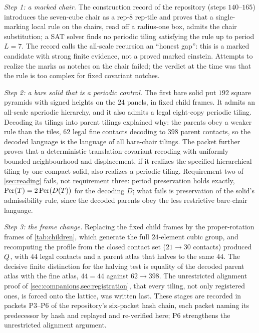 \emph{Step 1: a marked chair.} The construction record of the repository (steps $140$--$165$)
introduces the seven-cube chair as a rep-8 rep-tile and proves that a single-marking local rule
on the chairs, read off a radius-one box, admits the chair substitution; a SAT solver finds no
periodic tiling satisfying the rule up to period $L=7$. The record calls the all-scale recursion
an ``honest gap'': this is a marked candidate with strong finite evidence, not a proved marked
einstein. Attempts to realize the marks as notches on the chair failed; the verdict at the time
was that the rule is too complex for fixed covariant notches.

\emph{Step 2: a bare solid that is a periodic control.} The first bare solid put $192$ square
pyramids with signed heights on the $24$ panels, in fixed child frames. It admits an all-scale
aperiodic hierarchy, and it also admits a legal eight-copy periodic tiling. Decoding its tilings
into parent tilings explained why: the parents obey a weaker rule than the tiles, $62$ legal fine
contacts decoding to $398$ parent contacts, so the decoded language is the language of all
bare-chair tilings. The packet further proves that a deterministic translation-covariant recoding
with uniformly bounded neighbourhood and displacement, if it realizes the specified hierarchical
tiling by one compact solid, also realizes a periodic tiling. Requirement two of
\cref{sec:reading} fails, not requirement three: period preservation holds exactly,
$\operatorname{Per}(T)=2\operatorname{Per}(D(T))$ for the decoding $D$; what fails is preservation of the solid's
admissibility rule, since the decoded parents obey the less restrictive bare-chair language.

\emph{Step 3: the frame change.} Replacing the fixed child frames by the proper-rotation frames of
\cref{tab:children}, which generate the full $24$-element cubic group, and recomputing the
profile from the closed contact set ($21\to30$ contacts) produced $Q$, with $44$ legal
contacts and a parent atlas that halves to the same $44$. The decisive finite distinction for the
halving test is equality of the decoded parent atlas with the fine atlas, $44=44$ against
$62\to398$. The unrestricted alignment proof of \cref{sec:companions,sec:registration}, that every
tiling, not only registered ones, is forced onto the lattice, was written last. These stages are
recorded in packets P3--P6 of the repository's six-packet hash chain, each packet naming its
predecessor by hash and replayed and re-verified here; P6 strengthens the unrestricted alignment
argument.

